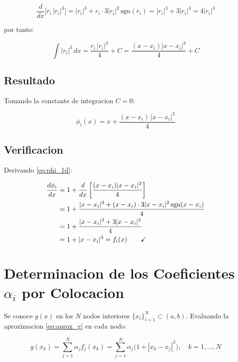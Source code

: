 \documentclass[12pt,a4paper]{article}
\begin{document}
\begin{equation}
    \frac{d}{dx}\bigl[r_i\,|r_i|^3\bigr]
    = |r_i|^3 + r_i \cdot 3|r_i|^2\,\text{sgn}(r_i)
    = |r_i|^3 + 3|r_i|^3 = 4|r_i|^3
\end{equation}

por tanto:

\begin{equation}
    \int |r_i|^3\,dx = \frac{r_i\,|r_i|^3}{4} + C
    = \frac{(x-x_i)|x-x_i|^3}{4} + C
\end{equation}

\subsection{Resultado}

Tomando la constante de integracion $C = 0$:

\begin{equation}
\boxed{
    \phi_i(x) = x + \frac{(x - x_i)\,|x - x_i|^3}{4}
}
\label{eq:phi_1d}
\end{equation}

\subsection{Verificacion}

Derivando \eqref{eq:phi_1d}:

\begin{align}
    \frac{d\phi_i}{dx}
    &= 1 + \frac{d}{dx}\left[\frac{(x-x_i)|x-x_i|^3}{4}\right] \notag \\
    &= 1 + \frac{|x-x_i|^3 + (x-x_i)\cdot 3|x-x_i|^2\,\text{sgn}(x-x_i)}{4} \notag \\
    &= 1 + \frac{|x-x_i|^3 + 3|x-x_i|^3}{4} \notag \\
    &= 1 + |x-x_i|^3 = f_i(x) \qquad \checkmark
\end{align}

\section{Determinacion de los Coeficientes $\alpha_i$ por Colocacion}

Se conoce $g(x)$ en los $N$ nodos interiores $\{x_i\}_{i=1}^N \subset (a,b)$.
Evaluando la aproximacion \eqref{eq:aprox_g} en cada nodo:

\begin{equation}
    g(x_k) = \sum_{j=1}^{N} \alpha_j f_j(x_k)
    = \sum_{j=1}^{N} \alpha_j \bigl(1 + |x_k - x_j|^3\bigr),
    \quad k = 1,\ldots,N
\end{equation}
\end{document}
